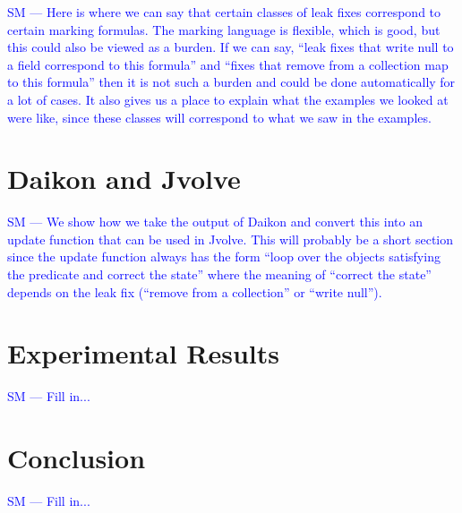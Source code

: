\documentclass[natbib,preprint]{sigplanconf}
\newcommand{\stephencomment}[1]{\textcolor{blue}{SM --- #1}}
\begin{document}
\stephencomment{Here is where we can say that certain classes of leak fixes correspond to certain marking formulas.  The marking language is flexible, which is good, but this could also be viewed as a burden.  If we can say, ``leak fixes that write null to a field correspond to this formula'' and ``fixes that remove from a collection map to this formula'' then it is not such a burden and could be done automatically for a lot of cases.  It also gives us a place to explain what the examples we looked at were like, since these classes will correspond to what we saw in the examples.}

\section{Daikon and Jvolve}

\stephencomment{We show how we take the output of Daikon and convert this into an update function that can be used in Jvolve.  This will probably be a short section since the update function always has the form ``loop over the objects satisfying the predicate and correct the state'' where the meaning of ``correct the state'' depends on the leak fix (``remove from a collection'' or ``write null'').}

\section{Experimental Results}

\stephencomment{Fill in...}

\section{Conclusion}

\stephencomment{Fill in...}




\end{document}
